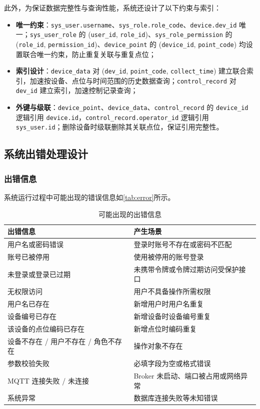 \documentclass[12pt,hyperref,a4paper,UTF8]{ctexart}
\begin{document}
\FloatBarrier

此外，为保证数据完整性与查询性能，系统还设计了以下约束与索引：

\begin{itemize}
    \item \textbf{唯一约束}：\texttt{sys\_user.username}、\texttt{sys\_role.role\_code}、\texttt{device.dev\_id} 唯一；\texttt{sys\_user\_role} 的 (\texttt{user\_id}, \texttt{role\_id})、\texttt{sys\_role\_permission} 的 (\texttt{role\_id}, \texttt{permission\_id})、\texttt{device\_point} 的 (\texttt{device\_id}, \texttt{point\_code}) 均设置联合唯一约束，防止重复关联与重复点位；
    \item \textbf{索引设计}：\texttt{device\_data} 对 (\texttt{dev\_id}, \texttt{point\_code}, \texttt{collect\_time}) 建立联合索引，加速按设备、点位与时间范围的历史数据查询；\texttt{control\_record} 对 \texttt{dev\_id} 建立索引，加速控制记录查询；
    \item \textbf{外键与级联}：\texttt{device\_point}、\texttt{device\_data}、\texttt{control\_record} 的 \texttt{device\_id} 逻辑引用 \texttt{device.id}，\texttt{control\_record.operator\_id} 逻辑引用 \texttt{sys\_user.id}；删除设备时级联删除其关联点位，保证引用完整性。
\end{itemize}

\subsection{系统出错处理设计}

\subsubsection{出错信息}

系统运行过程中可能出现的错误信息如\autoref{tab:error}所示。

\begin{table}[!htbp]
    \centering
    \caption{可能出现的出错信息}
    \label{tab:error}
    \begin{tabularx}{0.90\textwidth}{@{}L{5.2cm} Y@{}}
    \toprule
    \textbf{出错信息} & \textbf{产生场景} \\
    \midrule
    用户名或密码错误 & 登录时账号不存在或密码不匹配 \\
    账号已被停用 & 使用被停用的账号登录 \\
    未登录或登录已过期 & 未携带令牌或令牌过期访问受保护接口 \\
    无权限访问 & 用户不具备操作所需权限 \\
    用户名已存在 & 新增用户时用户名重复 \\
    设备编号已存在 & 新增设备时设备编号重复 \\
    该设备的点位编码已存在 & 新增点位时编码重复 \\
    设备不存在 / 用户不存在 / 角色不存在 & 操作对象不存在 \\
    参数校验失败 & 必填字段为空或格式错误 \\
    MQTT 连接失败 / 未连接 & Broker 未启动、端口被占用或网络异常 \\
    系统异常 & 数据库连接失败等未知错误 \\
    \bottomrule
    \end{tabularx}
\end{table}
\end{document}
